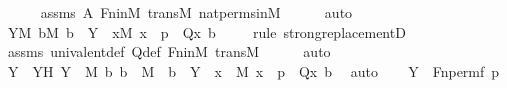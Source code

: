 \begin{isabellebody}
\ \ \ \ \isamarkupfalse%
\ assms\ {\isacartoucheopen}{\isacharquery}{\kern0pt}A{\isacartoucheclose}\ Fn{\isacharunderscore}{\kern0pt}in{\isacharunderscore}{\kern0pt}M\ transM\ nat{\isacharunderscore}{\kern0pt}perms{\isacharunderscore}{\kern0pt}in{\isacharunderscore}{\kern0pt}M\isanewline
\ \ \ \ \isamarkupfalse%
\ auto\isanewline
\ \ \isamarkupfalse%
\ \isamarkupfalse%
\ {\isachardoublequoteopen}{\isasymexists}Y{\isacharbrackleft}{\kern0pt}{\isacharhash}{\kern0pt}{\isacharhash}{\kern0pt}M{\isacharbrackright}{\kern0pt}{\isachardot}{\kern0pt}\ {\isasymforall}b{\isacharbrackleft}{\kern0pt}{\isacharhash}{\kern0pt}{\isacharhash}{\kern0pt}M{\isacharbrackright}{\kern0pt}{\isachardot}{\kern0pt}\ b\ {\isasymin}\ Y\ {\isasymlongleftrightarrow}\ {\isacharparenleft}{\kern0pt}{\isasymexists}x{\isacharbrackleft}{\kern0pt}{\isacharhash}{\kern0pt}{\isacharhash}{\kern0pt}M{\isacharbrackright}{\kern0pt}{\isachardot}{\kern0pt}\ x\ {\isasymin}\ p\ {\isasymand}\ Q{\isacharparenleft}{\kern0pt}x{\isacharcomma}{\kern0pt}\ b{\isacharparenright}{\kern0pt}{\isacharparenright}{\kern0pt}{\isachardoublequoteclose}\isanewline
\ \ \ \ \isamarkupfalse%
{\isacharparenleft}{\kern0pt}rule\ strong{\isacharunderscore}{\kern0pt}replacementD{\isacharparenright}{\kern0pt}\isanewline
\ \ \ \ \isamarkupfalse%
\ assms\ univalent{\isacharunderscore}{\kern0pt}def\ Q{\isacharunderscore}{\kern0pt}def\ Fn{\isacharunderscore}{\kern0pt}in{\isacharunderscore}{\kern0pt}M\ transM\isanewline
\ \ \ \ \isamarkupfalse%
\ auto\isanewline
\ \ \isamarkupfalse%
\ \isamarkupfalse%
\ Y\ \ YH{\isacharcolon}{\kern0pt}\ {\isachardoublequoteopen}Y\ {\isasymin}\ M{\isachardoublequoteclose}\ {\isachardoublequoteopen}{\isasymAnd}b{\isachardot}{\kern0pt}\ b\ {\isasymin}\ M\ {\isasymLongrightarrow}\ b\ {\isasymin}\ Y\ {\isasymlongleftrightarrow}\ {\isacharparenleft}{\kern0pt}{\isasymexists}x\ {\isasymin}\ M{\isachardot}{\kern0pt}\ x\ {\isasymin}\ p\ {\isasymand}\ Q{\isacharparenleft}{\kern0pt}x{\isacharcomma}{\kern0pt}\ b{\isacharparenright}{\kern0pt}{\isacharparenright}{\kern0pt}{\isachardoublequoteclose}\ \isamarkupfalse%
\ auto\isanewline
\isanewline
\ \ \isamarkupfalse%
\ {\isachardoublequoteopen}Y\ {\isacharequal}{\kern0pt}\ Fn{\isacharunderscore}{\kern0pt}perm{\isacharparenleft}{\kern0pt}f{\isacharcomma}{\kern0pt}\ p{\isacharparenright}{\kern0pt}{\isachardoublequoteclose}\isanewline
\ \ \isamarkupfalse%

\end{isabellebody}
